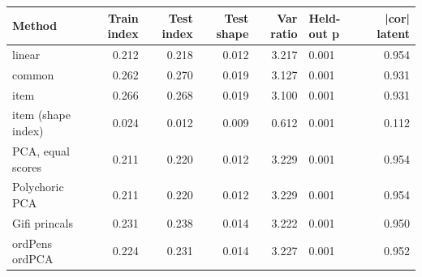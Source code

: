 \begin{tabular}{lrrrrlr}
\toprule
Method & Train index & Test index & Test shape & Var ratio & Held-out p & |cor| latent \\
\midrule
linear & 0.212 & 0.218 & 0.012 & 3.217 & 0.001 & 0.954 \\
common & 0.262 & 0.270 & 0.019 & 3.127 & 0.001 & 0.931 \\
item & 0.266 & 0.268 & 0.019 & 3.100 & 0.001 & 0.931 \\
item (shape index) & 0.024 & 0.012 & 0.009 & 0.612 & 0.001 & 0.112 \\
PCA, equal scores & 0.211 & 0.220 & 0.012 & 3.229 & 0.001 & 0.954 \\
Polychoric PCA & 0.211 & 0.220 & 0.012 & 3.229 & 0.001 & 0.954 \\
Gifi princals & 0.231 & 0.238 & 0.014 & 3.222 & 0.001 & 0.950 \\
ordPens ordPCA & 0.224 & 0.231 & 0.014 & 3.227 & 0.001 & 0.952 \\
\bottomrule
\end{tabular}
